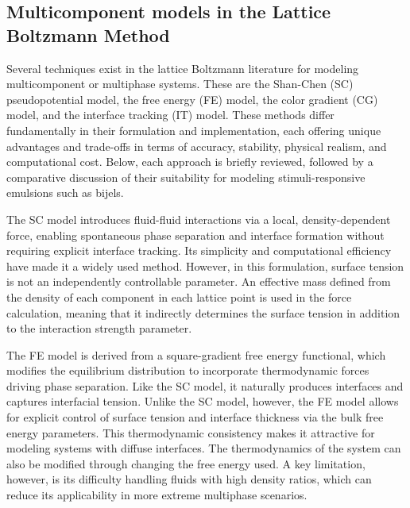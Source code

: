 \subsection{Multicomponent models in the Lattice Boltzmann Method}

Several techniques exist in the lattice Boltzmann literature for modeling multicomponent or multiphase systems. These are the Shan-Chen (SC) 
pseudopotential model, the free energy (FE) model, the color gradient (CG) model, and the interface tracking (IT) model.
These methods differ fundamentally in their formulation and implementation, each offering unique advantages and trade-offs in terms of accuracy, 
stability, physical realism, and computational cost. Below, each approach is briefly reviewed, followed by a comparative discussion of their 
suitability for modeling stimuli-responsive emulsions such as bijels.

The SC model introduces fluid-fluid interactions via a local, density-dependent force, enabling spontaneous phase separation and interface 
formation without requiring explicit interface tracking. 
\cite{shan_lattice_1993, shan_simulation_1994, shan_multicomponent_1995, jansen_bijels_2011,gunther_timescales_2014}
Its simplicity and computational efficiency have made it a widely used method. However,
in this formulation, surface tension is not an independently controllable parameter. An effective mass defined from the density of each component
in each lattice point is used in the force calculation, meaning that it indirectly determines the surface tension in addition to the interaction
strength parameter.

The FE model is derived from a square-gradient free energy functional, which modifies the equilibrium distribution to incorporate thermodynamic 
forces driving phase separation. \cite{swift_lattice_1996, kendon_inertial_2001, briant_lattice_2004} Like the SC model, it naturally produces interfaces and captures interfacial tension. Unlike the SC model, however, 
the FE model allows for explicit control of surface tension and interface thickness via the bulk free energy parameters. This thermodynamic 
consistency makes it attractive for modeling systems with diffuse interfaces. The thermodynamics of the system can also be modified through changing the free energy used.
\cite{swift_lattice_1996, briant_lattice_2004, kendon_inertial_2001}
A key limitation, however, is its difficulty handling fluids with high density ratios, which can reduce its applicability in more extreme multiphase scenarios.

